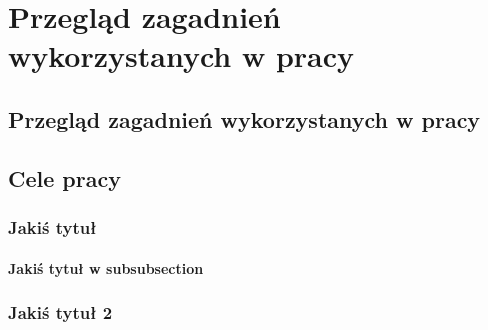 \chapter{Przegląd zagadnień wykorzystanych w pracy}
\label{cha:Przegląd zagadnień wykorzystanych w pracy}

\section{Przegląd zagadnień wykorzystanych w pracy}
\label{sec:Wprowadzenie}


\section{Cele pracy}
\label{sec:celePracy}

\subsection{Jakiś tytuł}
\subsubsection{Jakiś tytuł w subsubsection}
\subsection{Jakiś tytuł 2}